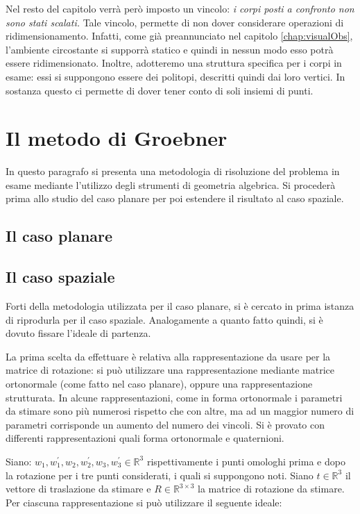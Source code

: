 Nel resto del capitolo verrà però imposto un vincolo: \textit{i corpi posti a confronto non sono stati scalati.} Tale vincolo, permette di non dover considerare operazioni di ridimensionamento. Infatti, come già preannunciato nel capitolo \ref{chap:visualObs}, l'ambiente circostante si supporrà statico e quindi in nessun modo esso potrà essere ridimensionato.
Inoltre, adotteremo una struttura specifica per i corpi in esame: essi si suppongono essere dei politopi, descritti quindi dai loro vertici. In sostanza questo ci permette di dover tener conto di soli insiemi di punti. 




\section{Il metodo di Groebner}
\label{sec:groeb}
In questo paragrafo si presenta una metodologia di risoluzione del problema in esame mediante l'utilizzo degli strumenti di geometria algebrica. Si procederà prima allo studio del caso planare per poi estendere il risultato al caso spaziale.

\subsection{Il caso planare}
\label{sec:groeb:plan}



\subsection{Il caso spaziale}
\label{sec:groeb:spaz}

Forti della metodologia utilizzata per il caso planare, si è cercato in prima istanza di riprodurla per il caso spaziale. Analogamente a quanto fatto quindi, si è dovuto fissare l'ideale di partenza. 

La prima scelta da effettuare è relativa alla rappresentazione da usare per la matrice di rotazione: si può utilizzare una rappresentazione mediante matrice ortonormale (come fatto nel caso planare), oppure una rappresentazione strutturata. In alcune rappresentazioni, come in forma ortonormale i parametri da stimare sono più numerosi rispetto che con altre, ma ad un maggior numero di parametri corrisponde un aumento del numero dei vincoli. 
Si è provato con differenti rappresentazioni quali forma ortonormale e quaternioni.

Siano: $w_1, w_1^{'}, w_2, w_2^{'}, w_3, w_3^{'} \in \mathbb{R}^3$ rispettivamente i punti omologhi prima e dopo la rotazione per i tre punti considerati, i quali si suppongono noti. Siano $t \in \mathbb{R}^3$ il vettore di traslazione da stimare e $R \in \mathbb{R}^{3 \times 3}$ la matrice di rotazione da stimare. Per ciascuna rappresentazione si può utilizzare il seguente ideale:


